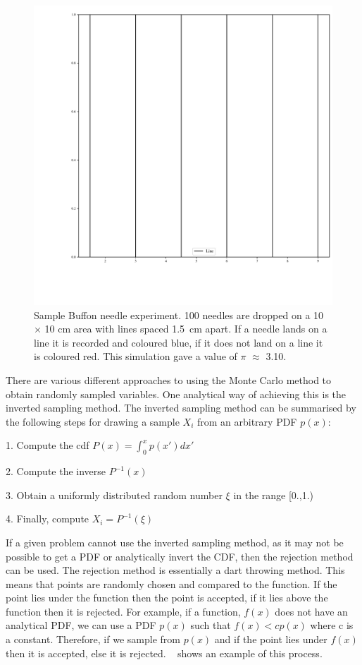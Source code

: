 \begin{figure}[!htbp]
    \centering
    \includegraphics[width=.55\textwidth]{buffon.pdf}
    \caption{Sample Buffon needle experiment. 100 needles are dropped on a 10 $\times$ 10 cm area with lines spaced 1.5~cm apart. If a needle lands on a line it is recorded and coloured blue, if it does not land on a line it is coloured red. This simulation gave a value of $\pi$ $\approx$ 3.10.}
    \label{fig:buffon-needle}
\end{figure}

There are various different approaches to using the Monte Carlo method to obtain randomly sampled variables.
One analytical way of achieving this is the inverted sampling method.
The inverted sampling method can be summarised by the following steps for drawing a sample $X_i$ from an arbitrary PDF $p(x)$:

\medskip

1. Compute the \gls*{cdf} $P(x)=\int^{x}_{0}p(x')dx'$

2. Compute the inverse $P^{-1}(x)$

3. Obtain a uniformly distributed random number $\xi$ in the range [0.,1.)

4. Finally, compute $X_i = P^{-1}(\xi)$

\medskip

If a given problem cannot use the inverted sampling method, as it may not be possible to get a PDF or analytically invert the CDF, then the rejection method can be used.
The rejection method is essentially a dart throwing method.
This means that points are randomly chosen and compared to the function.
If the point lies under the function then the point is accepted, if it lies above the function then it is rejected.
For example, if a function, $f(x)$ does not have an analytical PDF, we can use a PDF $p(x)$ such that $f(x) < cp(x)$ where c is a constant.
Therefore, if we sample from $p(x)$ and if the point lies under $f(x)$ then it is accepted, else it is rejected.
~ shows an example of this process.

